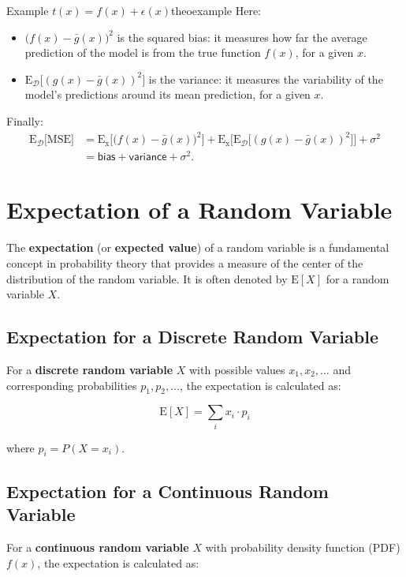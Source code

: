 \documentclass{tufte-handout}
\begin{document}
\begin{mybox}{Example $t(x) = f(x) + \epsilon(x) $}{theoexample}
Here:
\begin{itemize}
    \item \( \big(f(x) - \bar{g}(x)\big)^2 \) is the {squared bias}: it measures how far the average prediction of the model is from the true function \( f(x) \), for a given $x$.
    \item \( \mathrm{E_{\mathcal D}} \big[(g(x) - \bar{g}(x))^2\big] \) is the  {variance}: it measures the variability of the model's predictions around its mean prediction, for a given $x$.
\end{itemize}
Finally:
\begin{align*}
\mathrm E_{\mathcal D}  \big[ \text{MSE} \big]&=  \mathrm{E_x} \big[ \big(f(x) - \bar{g}(x)\big)^2 \big]+  \mathrm{E_x} \big[ \mathrm{E_{\mathcal D}} \big[(g(x) - \bar{g}(x))^2\big] \big]+ \sigma^2\\ &= \mathsf{bias + variance} + \sigma^2.
\end{align*}


\end{mybox}


\section*{Expectation of a Random Variable}

The \textbf{expectation} (or \textbf{expected value}) of a random variable is a fundamental concept in probability theory that provides a measure of the center of the distribution of the random variable. It is often denoted by \( \mathrm{E}[X] \) for a random variable \( X \).

\subsection*{Expectation for a Discrete Random Variable}

For a \textbf{discrete random variable} \( X \) with possible values \( x_1, x_2, \dots \) and corresponding probabilities \( p_1, p_2, \dots \), the expectation is calculated as:

\[
\mathrm{E}[X] = \sum_{i} x_i \cdot p_i
\]

where \( p_i = P(X = x_i) \).

\subsection*{Expectation for a Continuous Random Variable}

For a \textbf{continuous random variable} \( X \) with probability density function (PDF) \( f(x) \), the expectation is calculated as:
\end{document}
